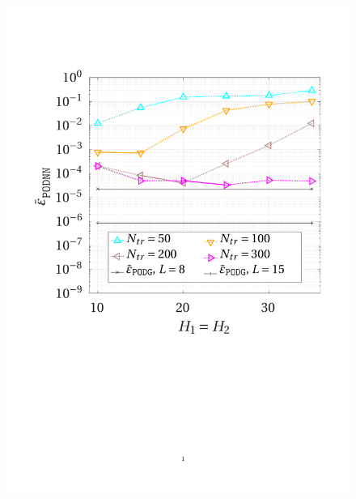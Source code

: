 \documentclass[12pt, a4paper, twoside, openright, notitlepage]{report}
\numberwithin{equation}{chapter}
\theoremstyle{theorem}
\theoremstyle{definition}
\theoremstyle{remark}
\theoremstyle{proposition}
\numberwithin{figure}{chapter}
\begin{document}
		\begin{figure}[t!]
			\center
			\includegraphics[scale = 0.42, trim = {1cm 9cm 1.5cm 3.5cm}, clip]{poisson1d_2_nn_convergence}

\end{figure}
\end{document}
